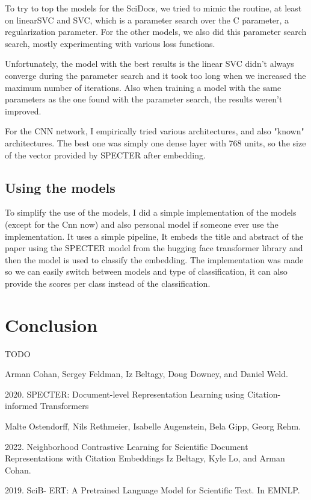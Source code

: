 \documentclass[conference]{IEEEtran}
\begin{document}
To try to top the models for the SciDocs, we tried to mimic the routine, at least on linearSVC and SVC, which is a parameter search over the C parameter, a regularization parameter. For the other models, we also did this parameter search search, mostly experimenting with various loss functions.

Unfortunately, the model with the best results is the linear SVC didn't always converge during the parameter search and it took too long when we increased the maximum number of iterations. Also when training a model with the same parameters as the one found with the parameter search, the results weren't improved.

For the CNN network, I empirically tried various architectures, and also "known" architectures. The best one was simply one dense layer with 768 units, so the size of the vector provided by SPECTER after embedding.

\subsection{Using the models}

To simplify the use of the models, I did a simple implementation of the models (except for the Cnn now) and also personal model if someone ever use the implementation. It uses a simple pipeline, It embeds the title and abstract of the paper using the SPECTER model from the hugging face transformer library and then the model is used to classify the embedding. The implementation was made so we can easily switch between models and type of classification, it can also provide the scores per class instead of the classification.

\section{Conclusion}

TODO

\begin{thebibliography}{00}
Arman Cohan, Sergey Feldman, Iz Beltagy, Doug Downey, and Daniel Weld. 

2020. SPECTER: Document-level Representation Learning using Citation-informed Transformers

 Malte Ostendorff, Nils Rethmeier, Isabelle Augenstein, Bela Gipp, Georg Rehm.

2022. Neighborhood Contrastive Learning for Scientific Document Representations with Citation Embeddings
 Iz Beltagy, Kyle Lo, and Arman Cohan.

2019. SciB- ERT: A Pretrained Language Model for Scientific Text. In EMNLP.

\end{thebibliography}
\vspace{12pt}
\end{document}
